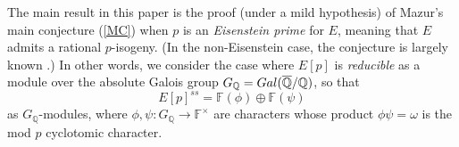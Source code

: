 \documentclass[a4paper,10pt]{amsart}
\numberwithin{equation}{section}
\numberwithin{equation}{section}
\theoremstyle{plain}
\theoremstyle{definition}
\theoremstyle{definition}
\theoremstyle{plain}
\theoremstyle{plain}
\theoremstyle{plain}
\theoremstyle{plain}
\newcommand{\Q}{\mathbb{Q}}
\newcommand{\X}{\mathfrak{X}}
\newcommand{\Lcal}{\mathcal{L}}
\begin{document}
The main result in this paper is the proof (under a mild hypothesis) of Mazur's main conjecture (\ref{MC}) when $p$ is an 
\emph{Eisenstein prime} for $E$, meaning that $E$ admits a rational $p$-isogeny. (In the non-Eisenstein case, the conjecture is largely known \cite{kato-euler-systems,skinner-urban,wan-hilbert}.) In other words, we consider the case where $E[p]$ is \emph{reducible} as a module over the absolute Galois group $G_\Q={\rm Gal}(\overline{\Q}/\Q)$, so that
\[
E[p]^{ss}=\mathbb{F}(\phi)\oplus\mathbb{F}(\psi)
\] 
as $G_\Q$-modules, where $\phi,\psi:G_\Q\rightarrow\mathbb{F}^\times$ are characters whose product $\phi\psi=\omega$ is the mod $p$ cyclotomic character. 

\end{document}
